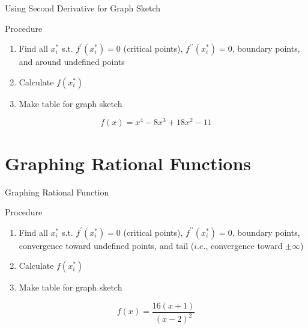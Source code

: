 \documentclass[final]{beamer}
\begin{document}
\begin{frame}[t]{Using Second Derivative for Graph Sketch}
	\begin{block}{Procedure}
		\begin{enumerate}[(STEP 1)]
			\item Find all $x_i^\ast$ s.t. $f^\prime (x_i^\ast)=0$ (critical points), \uline{$f^{\prime\prime}(x_i^\ast)=0$}, boundary points, and around undefined points
			\item Calculate $f(x_i^\ast)$
			\item Make table for graph sketch
		\end{enumerate}
	\end{block}
	\[
		f(x) = x^4 -8x^3 + 18x^2 - 11 \tag{Ex3.1}
	\]
\end{frame}


\section{Graphing Rational Functions} %
\label{sec:graphing_rational_functions}
\begin{frame}[t]{Graphing Rational Function}
	\begin{block}{Procedure}
		\begin{enumerate}[(STEP 1)]
			\item Find all $x_i^\ast$ s.t. $f^\prime (x_i^\ast)=0$ (critical points), $f^{\prime\prime}(x_i^\ast)=0$, boundary points, convergence toward undefined points, and tail ($i.e.$, convergence toward $\pm\infty$)
			\item Calculate $f(x_i^\ast)$
			\item Make table for graph sketch
		\end{enumerate}
	\end{block}
	\[
		\tag{Ex3.6} f(x) = \frac{16(x+1)}{(x-2)^2}
	\]
\end{frame}
\end{document}

